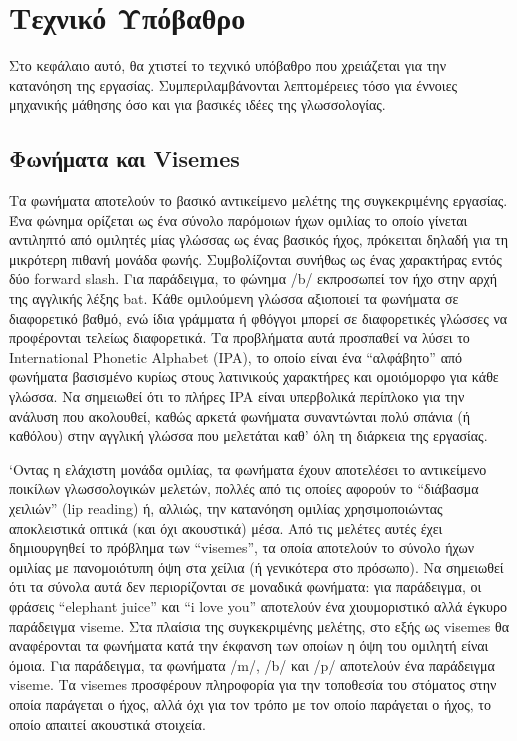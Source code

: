 \section{Τεχνικό Υπόβαθρο}
\label{Background}

Στο κεφάλαιο αυτό, θα χτιστεί το τεχνικό υπόβαθρο που χρειάζεται για την κατανόηση της εργασίας. Συμπεριλαμβάνονται λεπτομέρειες τόσο για έννοιες μηχανικής μάθησης όσο και για βασικές ιδέες της γλωσσολογίας.

\subsection{Φωνήματα και Visemes}
\label{Phonemes}
Τα φωνήματα αποτελούν το βασικό αντικείμενο μελέτης της συγκεκριμένης εργασίας. Ένα φώνημα ορίζεται ως ένα σύνολο παρόμοιων ήχων ομιλίας το οποίο γίνεται αντιληπτό από ομιλητές μίας γλώσσας ως ένας βασικός ήχος, πρόκειται δηλαδή για τη μικρότερη πιθανή μονάδα φωνής. Συμβολίζονται συνήθως ως ένας χαρακτήρας εντός δύο forward slash. Για παράδειγμα, το φώνημα /b/ εκπροσωπεί τον ήχο στην αρχή της αγγλικής λέξης bat. Κάθε ομιλούμενη γλώσσα αξιοποιεί τα φωνήματα σε διαφορετικό βαθμό, ενώ ίδια γράμματα ή φθόγγοι μπορεί σε διαφορετικές γλώσσες να προφέρονται τελείως διαφορετικά. Τα προβλήματα αυτά προσπαθεί να λύσει το International Phonetic Alphabet (IPA), το οποίο είναι ένα ``αλφάβητο'' από φωνήματα βασισμένο κυρίως στους λατινικούς χαρακτήρες και ομοιόμορφο για κάθε γλώσσα. Να σημειωθεί ότι το πλήρες IPA είναι υπερβολικά περίπλοκο για την ανάλυση που ακολουθεί, καθώς αρκετά φωνήματα συναντώνται πολύ σπάνια (ή καθόλου) στην αγγλική γλώσσα που μελετάται καθ' όλη τη διάρκεια της εργασίας.

`Οντας η ελάχιστη μονάδα ομιλίας, τα φωνήματα έχουν αποτελέσει το αντικείμενο ποικίλων γλωσσολογικών μελετών, πολλές από τις οποίες αφορούν το ``διάβασμα χειλιών'' (lip reading) ή, αλλιώς, την κατανόηση ομιλίας χρησιμοποιώντας αποκλειστικά οπτικά (και όχι ακουστικά) μέσα. Από τις μελέτες αυτές έχει δημιουργηθεί το πρόβλημα των ``visemes'', τα οποία αποτελούν το σύνολο ήχων ομιλίας με πανομοιότυπη όψη στα χείλια (ή γενικότερα στο πρόσωπο). Να σημειωθεί ότι τα σύνολα αυτά δεν περιορίζονται σε μοναδικά φωνήματα: για παράδειγμα, οι φράσεις ``elephant juice'' και ``i love you'' αποτελούν ένα χιουμοριστικό αλλά έγκυρο παράδειγμα viseme. Στα πλαίσια της συγκεκριμένης μελέτης, στο εξής ως visemes θα αναφέρονται τα φωνήματα κατά την έκφανση των οποίων η όψη του ομιλητή είναι όμοια. Για παράδειγμα, τα φωνήματα /m/, /b/ και /p/ αποτελούν ένα παράδειγμα viseme. Τα visemes προσφέρουν πληροφορία για την τοποθεσία του στόματος στην οποία παράγεται ο ήχος, αλλά όχι για τον τρόπο με τον οποίο παράγεται ο ήχος, το οποίο απαιτεί ακουστικά στοιχεία.

